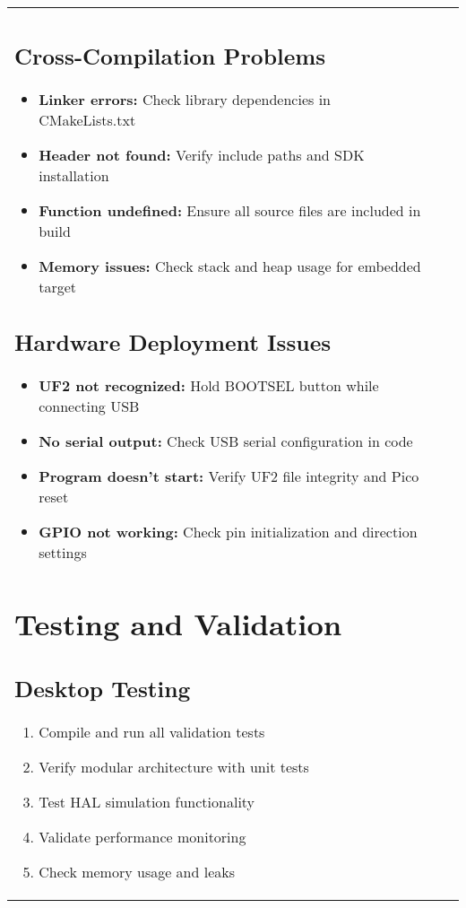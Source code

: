 \documentclass[11pt,a4paper]{article}
\begin{document}
\begin{center}
\begin{tabular}{|l|c|l|}
\subsection{Cross-Compilation Problems}
\begin{itemize}
    \item \textbf{Linker errors:} Check library dependencies in CMakeLists.txt
    \item \textbf{Header not found:} Verify include paths and SDK installation
    \item \textbf{Function undefined:} Ensure all source files are included in build
    \item \textbf{Memory issues:} Check stack and heap usage for embedded target
\end{itemize}

\subsection{Hardware Deployment Issues}
\begin{itemize}
    \item \textbf{UF2 not recognized:} Hold BOOTSEL button while connecting USB
    \item \textbf{No serial output:} Check USB serial configuration in code
    \item \textbf{Program doesn't start:} Verify UF2 file integrity and Pico reset
    \item \textbf{GPIO not working:} Check pin initialization and direction settings
\end{itemize}

\section{Testing and Validation}

\subsection{Desktop Testing}
\begin{enumerate}
    \item Compile and run all validation tests
    \item Verify modular architecture with unit tests
    \item Test HAL simulation functionality
    \item Validate performance monitoring
    \item Check memory usage and leaks
\end{enumerate}


\end{tabular}
\end{center}
\end{document}
